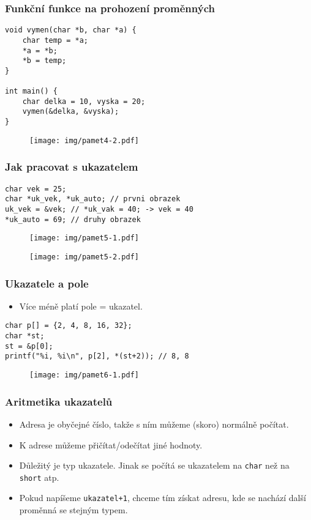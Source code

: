 \documentclass{beamer}
\newenvironment{itemizex}%
  {\large \begin{itemize}%
    \setlength{\itemsep}{8pt}%
    \setlength{\parskip}{8pt}}%
  {\end{itemize}}
\begin{document}
\begin{frame}[t,fragile]\frametitle{Funkční funkce na prohození proměnných} 
\begin{verbatim} 
void vymen(char *b, char *a) {
    char temp = *a;
    *a = *b;
    *b = temp;
}

int main() {
    char delka = 10, vyska = 20;
    vymen(&delka, &vyska);
}
\end{verbatim}

\begin{figure}[htb]
    \centering
    \texttt{[image: img/pamet4-2.pdf]}
\end{figure}
\end{frame}


\begin{frame}[t,fragile]\frametitle{Jak pracovat s ukazatelem} 
\begin{verbatim} 
char vek = 25;    
char *uk_vek, *uk_auto; // prvni obrazek
uk_vek = &vek; // *uk_vak = 40; -> vek = 40
*uk_auto = 69; // druhy obrazek
\end{verbatim}

\begin{figure}[htb]
    \centering
    \texttt{[image: img/pamet5-1.pdf]}
\end{figure}

\begin{figure}[htb]
    \centering
    \texttt{[image: img/pamet5-2.pdf]}
\end{figure}
\end{frame}


\begin{frame}[t,fragile]\frametitle{Ukazatele a pole} 
    \begin{itemizex}
        \item Více méně platí pole = ukazatel.
    \end{itemizex}

\begin{verbatim} 
char p[] = {2, 4, 8, 16, 32};
char *st;
st = &p[0];
printf("%i, %i\n", p[2], *(st+2)); // 8, 8
\end{verbatim}
\begin{figure}[htb]
    \centering
    \texttt{[image: img/pamet6-1.pdf]}
\end{figure}
\end{frame}


\begin{frame}[t,fragile]\frametitle{Aritmetika ukazatelů} 
    \begin{itemizex}
        \item Adresa je obyčejné číslo, takže s ním můžeme (skoro) normálně počítat.
        \item K adrese můžeme přičítat/odečítat jiné hodnoty.
        \item Důležitý je typ ukazatele. Jinak se počítá se ukazatelem na \texttt{char} než na \texttt{short} atp. 
        \item Pokud napíšeme \texttt{ukazatel+1}, chceme tím získat adresu, kde se nachází další proměnná se stejným typem.
    \end{itemizex}
\end{frame}
\end{document}
